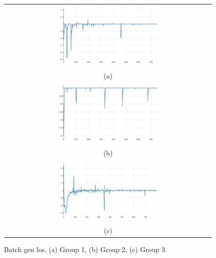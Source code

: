 \documentclass[10pt,twocolumn,letterpaper]{article}
\begin{document}
\begin{figure}%
\centering\begin{tabular}{c}
\includegraphics[width=0.5\textwidth]{fig9-a}\\
(a)\\[3ex]%
\includegraphics[width=0.5\textwidth]{fig9-b}\\
(b)\\[3ex]
\includegraphics[width=0.5\textwidth]{fig9-c}\\
(c)
\end{tabular}
\caption{Batch gen los. (a) Group 1, (b) Group 2, (c) Group 3.}%
\label{fig9}%
\end{figure}
\end{document}
